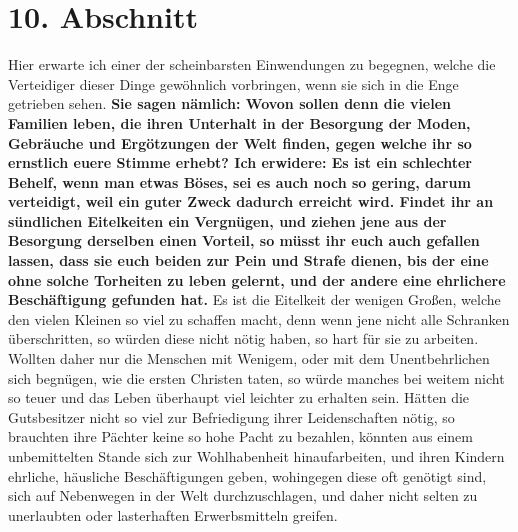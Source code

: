 \section{10. Abschnitt} \label{kap17_ab10}

 Hier erwarte ich einer der scheinbarsten Einwendungen zu
begegnen, welche die
Verteidiger dieser Dinge gewöhnlich vorbringen, wenn sie sich in die Enge
getrieben sehen. \label{ref:17_10_einwand}\textbf{Sie
sagen nämlich: Wovon sollen
denn die vielen Familien leben,
die ihren Unterhalt in der Besorgung der Moden, Gebräuche und Ergötzungen der
Welt finden, gegen welche ihr so ernstlich euere Stimme erhebt? Ich erwidere:
Es
ist ein schlechter Behelf, wenn man etwas Böses, sei es auch noch so gering,
darum verteidigt, weil ein guter Zweck dadurch erreicht wird. Findet ihr an
sündlichen Eitelkeiten ein Vergnügen, und ziehen jene aus der Besorgung
derselben einen Vorteil, so müsst ihr euch auch gefallen lassen, dass sie euch
beiden zur Pein und Strafe dienen, bis der eine ohne solche Torheiten zu leben
gelernt, und der andere eine ehrlichere Beschäftigung gefunden hat.} Es ist die
Eitelkeit der wenigen Großen, welche den vielen Kleinen so viel zu schaffen
macht, denn wenn jene nicht alle Schranken überschritten, so würden diese nicht
nötig haben, so hart für sie zu arbeiten. Wollten daher nur die Menschen mit
Wenigem, oder mit dem Unentbehrlichen sich begnügen, wie die ersten Christen
taten, so würde manches bei weitem nicht so teuer und das Leben überhaupt viel
leichter zu erhalten sein. Hätten die Gutsbesitzer nicht so viel zur
Befriedigung ihrer Leidenschaften nötig, so brauchten ihre Pächter keine so
hohe Pacht zu bezahlen, könnten aus einem unbemittelten Stande sich zur
Wohlhabenheit hinaufarbeiten, und ihren Kindern ehrliche, häusliche
Beschäftigungen geben, wohingegen diese oft genötigt sind, sich auf Nebenwegen
in der Welt durchzuschlagen, und daher nicht selten zu unerlaubten oder
lasterhaften Erwerbsmitteln greifen.

\medskip

